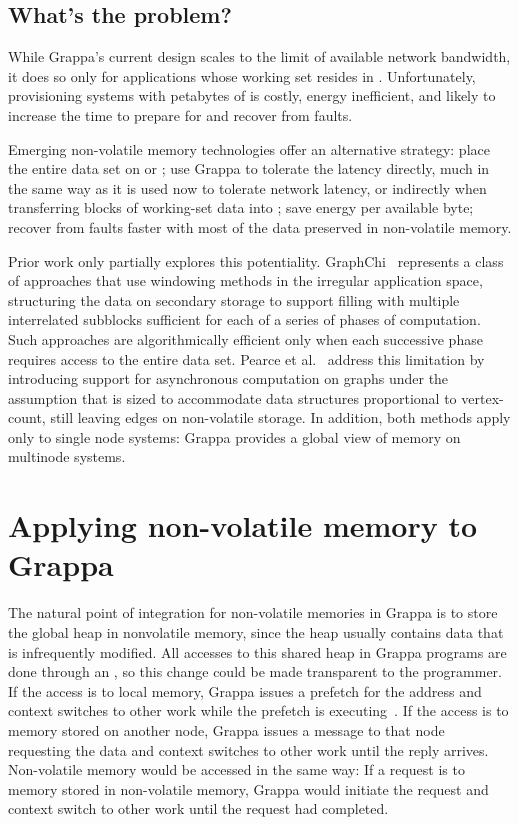 \subsection{What's the problem?}

While Grappa's current design scales to the limit of available network
bandwidth, it does so only for applications whose working set resides
in \@.  Unfortunately, provisioning systems with petabytes of  is
costly, energy inefficient, and likely to increase the time to prepare
for and recover from faults.

Emerging non-volatile memory technologies offer an alternative strategy:
place the entire data set on  or ;
use Grappa to tolerate the latency directly, much in the same
way as it is used now to tolerate network latency, or indirectly when transferring blocks of working-set
data into ; save energy per available byte;
recover from faults faster with most of the data preserved in non-volatile memory.

Prior work only partially explores this potentiality. GraphChi~\cite{graphchi:osdi12}
represents a class of approaches that use windowing methods in the
irregular application space, structuring the data on secondary storage
to support filling  with multiple interrelated subblocks sufficient
for each of a series of phases of computation.  Such approaches are
algorithmically efficient only when each successive phase requires
access to the entire data set.  Pearce et al.~\cite{magt:2010} address this limitation by
introducing support for asynchronous computation on graphs under the
assumption that  is sized to accommodate data structures
proportional to vertex-count, still leaving edges on non-volatile
storage.  In addition, both methods apply only to single node systems:
Grappa provides a global view of memory on multinode systems.

\section{Applying non-volatile memory to Grappa}
The natural point of integration for non-volatile memories in Grappa
is to store the global heap in nonvolatile memory, since the heap
usually contains data that is infrequently modified. All accesses to
this shared heap in Grappa programs are done through an , so this change could be made transparent to the programmer. If the
access is to local memory, Grappa issues a prefetch for the address
and context switches to other work while the prefetch is executing~\cite{Nelson:hotpar2011}. If
the access is to memory stored on another node, Grappa issues a
message to that node requesting the data and context switches to other
work until the reply arrives. Non-volatile memory would be accessed in
the same way: If a request is to memory stored in non-volatile memory,
Grappa would initiate the request and context switch to other work
until the request had completed.

